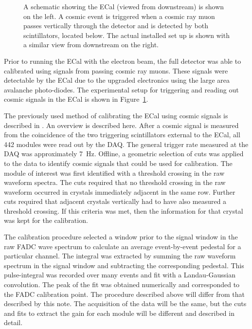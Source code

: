 \documentclass[twoside]{article}
\begin{document}
\begin{figure}[hbt]
\begin{minipage}{0.45\textwidth}
 \end{minipage}
 \caption[Setup for the cosmic trigger]{A schematic showing the ECal (viewed from downstream) is shown on the left. A cosmic event is triggered when a cosmic ray muon passes vertically through the detector and is detected by both scintillators, located below. The actual installed set up is shown with a similar view from downstream on the right.}
  \label{fig:cosmicSetup}
\end{figure}
Prior to running the ECal with the electron beam, the full detector was able to calibrated using signals from passing cosmic ray muons. These signals were detectable by the ECal due to the upgraded electronics using the large area avalanche photo-diodes. The experimental setup for triggering and reading out cosmic signals in the ECal is shown in Figure~\ref{fig:cosmicSetup}.

The previously used method of calibrating the ECal using cosmic signals is described in \cite{szumila-vance_hps_2016}. An overview is described here. After a cosmic signal is measured from the coincidence of the two triggering scintillators external to the ECal, all 442 modules were read out by the DAQ. The general trigger rate measured at the DAQ was approximately 7~Hz. Offline, a geometric selection of cuts was applied to the data to identify cosmic signals that could be used for calibration. The module of interest was first identified with a threshold crossing in the raw waveform spectra. The cuts required that no threshold crossing in the raw waveform occurred in crystals immediately adjacent in the same row. Further cuts required that adjacent crystals vertically had to have also measured a threshold crossing. If this criteria was met, then the information for that crystal was kept for the calibration.

The calibration procedure selected a window prior to the signal window in the raw FADC wave spectrum to calculate an average event-by-event pedestal for a particular channel. The integral was extracted by summing the raw waveform spectrum in the signal window and subtracting the corresponding pedestal. This pulse-integral was recorded over many events and fit with a Landau-Gaussian convolution. The peak of the fit was obtained numerically and corresponded to the FADC calibration point. The procedure described above will differ from that described by this note. The acquisition of the data will be the same, but the cuts and fits to extract the gain for each module will be different and described in detail. 
\end{document}
